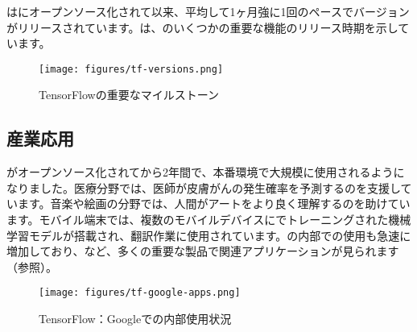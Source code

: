 \begin{content}
\tf{}はにオープンソース化されて以来、平均して1ヶ月強に1回のペースでバージョンがリリースされています。は、\tf{}のいくつかの重要な機能のリリース時期を示しています。

\begin{figure}[!htbp]
\centering
\texttt{[image: figures/tf-versions.png]}
\caption{TensorFlowの重要なマイルストーン}
 \label{fig:tf-versions}
\end{figure}

\subsection{産業応用}

がオープンソース化されてから2年間で、本番環境で大規模に使用されるようになりました。医療分野では、医師が皮膚がんの発生確率を予測するのを支援しています。音楽や絵画の分野では、人間がアートをより良く理解するのを助けています。モバイル端末では、複数のモバイルデバイスにでトレーニングされた機械学習モデルが搭載され、翻訳作業に使用されています。の内部での使用も急速に増加しており、など、多くの重要な製品で関連アプリケーションが見られます（参照）。

\begin{figure}[!htbp]
\centering
\texttt{[image: figures/tf-google-apps.png]}
\caption{TensorFlow：Googleでの内部使用状況}
 \label{fig:tf-google-apps}
\end{figure}

\end{content}
